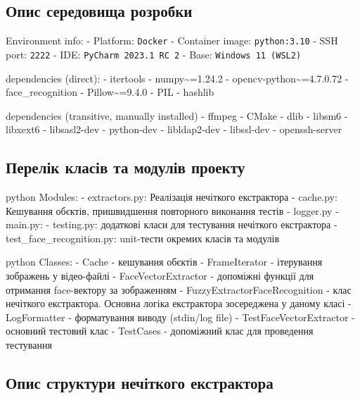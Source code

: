 \documentclass[11pt]{article}
\begin{document}
    \hypertarget{ux43eux43fux438ux441-ux441ux435ux440ux435ux434ux43eux432ux438ux449ux430-ux440ux43eux437ux440ux43eux431ux43aux438}{%
\subsection{Опис середовища
розробки}\label{ux43eux43fux438ux441-ux441ux435ux440ux435ux434ux43eux432ux438ux449ux430-ux440ux43eux437ux440ux43eux431ux43aux438}}

Environment info: - Platform: \texttt{Docker} - Container image:
\texttt{python:3.10} - SSH port: \texttt{2222} - IDE:
\texttt{PyCharm\ 2023.1\ RC\ 2} - Base: \texttt{Windows\ 11\ (WSL2)}

dependencies (direct): - itertools - numpy\textasciitilde=1.24.2 -
opencv-python\textasciitilde=4.7.0.72 - face\_recognition -
Pillow\textasciitilde=9.4.0 - PIL - hashlib

dependencies (transitive, manually installed) - ffmpeg - CMake - dlib -
libsm6 - libxext6 - libsasl2-dev - python-dev - libldap2-dev -
libssl-dev - openssh-server

\hypertarget{ux43fux435ux440ux435ux43bux456ux43a-ux43aux43bux430ux441ux456ux432-ux442ux430-ux43cux43eux434ux443ux43bux456ux432-ux43fux440ux43eux435ux43aux442ux443}{%
\subsection{Перелік класів та модулів
проекту}\label{ux43fux435ux440ux435ux43bux456ux43a-ux43aux43bux430ux441ux456ux432-ux442ux430-ux43cux43eux434ux443ux43bux456ux432-ux43fux440ux43eux435ux43aux442ux443}}

python Modules: - extractors.py: Реалізація нечіткого екстрактора -
cache.py: Кешування обєктів, пришвидшення повторного виконання тестів -
logger.py - main.py: - testing.py: додаткові класи для тестування
нечіткого екстрактора - test\_face\_recognition.py: unit-тести окремих
класів та модулів

python Classes: - Cache - кешування обєктів - FrameIterator - ітерування
зображень у відео-файлі - FaceVectorExtractor - допоміжні функції для
отримання face-вектору за зображенням - FuzzyExtractorFaceRecognition -
клас нечіткого екстрактора. Основна логіка екстрактора зосереджена у
даному класі - LogFormatter - форматування виводу (stdin/log file) -
TestFaceVectorExtractor - основний тестовий клас - TestCases -
допоміжний клас для проведення тестування

    \hypertarget{ux43eux43fux438ux441-ux441ux442ux440ux443ux43aux442ux443ux440ux438-ux43dux435ux447ux456ux442ux43aux43eux433ux43e-ux435ux43aux441ux442ux440ux430ux43aux442ux43eux440ux430}{%
\subsection{Опис структури нечіткого
екстрактора}\label{ux43eux43fux438ux441-ux441ux442ux440ux443ux43aux442ux443ux440ux438-ux43dux435ux447ux456ux442ux43aux43eux433ux43e-ux435ux43aux441ux442ux440ux430ux43aux442ux43eux440ux430}}
\end{document}

